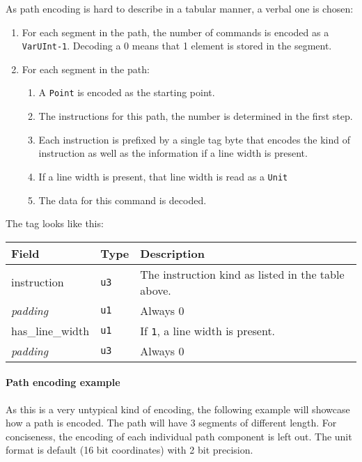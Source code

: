 \documentclass[]{article}
\providecommand{\tightlist}{%
  \setlength{\itemsep}{0pt}\setlength{\parskip}{0pt}}
\begin{document}
As path encoding is hard to describe in a tabular manner, a verbal one
is chosen:

\begin{enumerate}
\def\labelenumi{\arabic{enumi}.}
\tightlist
\item
  For each segment in the path, the number of commands is encoded as a
  \texttt{VarUInt-1}. Decoding a 0 means that 1 element is stored in the segment.
\item
  For each segment in the path:

  \begin{enumerate}
  \def\labelenumii{\arabic{enumii}.}
  \tightlist
  \item
    A \texttt{Point} is encoded as the starting point.
  \item
    The instructions for this path, the number is determined in the
    first step.
  \item
    Each instruction is prefixed by a single tag byte that encodes the
    kind of instruction as well as the information if a line width is
    present.
  \item
    If a line width is present, that line width is read as a
    \texttt{Unit}
  \item
    The data for this command is decoded.
  \end{enumerate}
\end{enumerate}

The tag looks like this:

\begin{longtable}[]{@{}p{1in}p{0.5in}p{4.5in}@{}}
\toprule
Field & Type & Description \\
\midrule
\endhead
instruction & \texttt{u3} & The instruction kind as listed in the table above. \\
\emph{padding} & \texttt{u1} & Always 0 \\
has\_line\_width & \texttt{u1} & If \texttt{1}, a line width is present. \\
\emph{padding} & \texttt{u3} & Always 0 \\
\bottomrule
\end{longtable}

\paragraph{Path encoding example} As this is a very untypical kind of encoding, the following example will showcase how a path is encoded. The path will have 3 segments of different length. For conciseness, the encoding of each individual path component is left out. The unit format is default (16 bit coordinates) with 2 bit precision.
\end{document}

